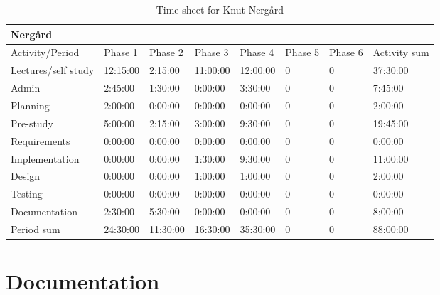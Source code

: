 \documentclass[11pt]{book}
\begin{document}
\begin{table}[H]
\centering
\begin{tabular}{| l | l | l | l | l | l | l | l |}
    \hline
    Nergård             &             &             &             &             &             &             &                 \\ \hline         
    Activity/Period     & Phase 1     & Phase 2     & Phase  3    & Phase 4     & Phase 5     & Phase 6     & Activity sum    \\ \hline
    Lectures/self study & 12:15:00    & 2:15:00     & 11:00:00    & 12:00:00    & 0           & 0           & 37:30:00        \\ \hline
    Admin               & 2:45:00     & 1:30:00     & 0:00:00     & 3:30:00     & 0           & 0           & 7:45:00         \\ \hline
    Planning            & 2:00:00     & 0:00:00     & 0:00:00     & 0:00:00     & 0           & 0           & 2:00:00         \\ \hline
    Pre-study           & 5:00:00     & 2:15:00     & 3:00:00     & 9:30:00     & 0           & 0           & 19:45:00        \\ \hline
    Requirements        & 0:00:00     & 0:00:00     & 0:00:00     & 0:00:00     & 0           & 0           & 0:00:00         \\ \hline
    Implementation      & 0:00:00     & 0:00:00     & 1:30:00     & 9:30:00     & 0           & 0           & 11:00:00        \\ \hline
    Design              & 0:00:00     & 0:00:00     & 1:00:00     & 1:00:00     & 0           & 0           & 2:00:00         \\ \hline
    Testing             & 0:00:00     & 0:00:00     & 0:00:00     & 0:00:00     & 0           & 0           & 0:00:00         \\ \hline
    Documentation       & 2:30:00     & 5:30:00     & 0:00:00     & 0:00:00     & 0           & 0           & 8:00:00         \\ \hline
    Period sum          & 24:30:00    & 11:30:00    & 16:30:00    & 35:30:00    & 0           & 0           & 88:00:00        \\ \hline
\end{tabular}
\caption{Time sheet for Knut Nergård}
\label{tab:appendix_timesheets_knut}
\end{table}

\chapter{Documentation}\label{chap:documentation}
\end{document}
